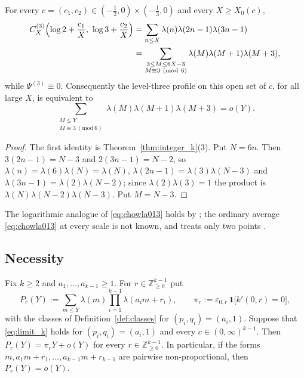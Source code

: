 \begin{corollary}
\label{cor:level3_23}
For every $c=(c_1,c_2)\in(-\tfrac12,0)\times(-\tfrac13,0)$ and every $X\ge X_0(c)$,
\begin{equation}
\begin{aligned}
C^{(3)}_X\Bigl(\log2+\frac{c_1}X,\ \log3+\frac{c_2}X\Bigr)&=\sum_{n\le X}\lambda(n)\lambda(2n-1)\lambda(3n-1)\\
&=\sum_{\substack{3\le M\le 6X-3\\ M\equiv3\ (\mathrm{mod}\ 6)}}\lambda(M)\lambda(M+1)\lambda(M+3),
\end{aligned}
\label{eq:level3_23}
\end{equation}
while $\Psi^{(3)}\equiv0$. Consequently the level-three profile on this open set of $c$, for all large $X$, is equivalent to
\begin{equation}
\sum_{\substack{M\le Y\\ M\equiv3\ (\mathrm{mod}\ 6)}}\lambda(M)\lambda(M+1)\lambda(M+3)=o(Y).
\label{eq:chowla013}
\end{equation}
\end{corollary}

\begin{proof}
The first identity is Theorem~\ref{thm:integer_k}(3). Put $N=6n$. Then $3(2n-1)=N-3$ and $2(3n-1)=N-2$, so $\lambda(n)=\lambda(6)\lambda(N)=\lambda(N)$, $\lambda(2n-1)=\lambda(3)\lambda(N-3)$ and $\lambda(3n-1)=\lambda(2)\lambda(N-2)$; since $\lambda(2)\lambda(3)=1$ the product is $\lambda(N)\lambda(N-2)\lambda(N-3)$. Put $M=N-3$.
\end{proof}

The logarithmic analogue of \eqref{eq:chowla013} holds by \cite[Theorem~1.1, p.~2]{TaoTeravainen2018}; the ordinary average \eqref{eq:chowla013} at every scale is not known, and \cite{OpenAI2026} treats only two points \cite[pp.~3--4]{OpenAI2026}.

\subsection{Necessity}
\label{subsec:kpoint_nec}

\begin{theorem}[Necessity]
\label{thm:nec_k}
Fix $k\ge2$ and $a_1,\dots,a_{k-1}\ge1$. For $r\in\mathbb Z_{\ge0}^{k-1}$ put
\begin{equation}
P_r(Y):=\sum_{m\le Y}\lambda(m)\prod_{i=1}^{k-1}\lambda(a_im+r_i),\qquad \pi_r:=\varepsilon_{0,r}\,\mathbf 1\bigl[k'(0,r)=0\bigr],
\label{eq:Pr}
\end{equation}
with the classes of Definition~\ref{def:classes} for $(p_i,q_i)=(a_i,1)$. Suppose that \eqref{eq:limit_k} holds for $(p_i,q_i)=(a_i,1)$ and every $c\in(0,\infty)^{k-1}$. Then $P_r(Y)=\pi_rY+o(Y)$ for every $r\in\mathbb Z_{\ge0}^{k-1}$. In particular, if the forms $m,a_1m+r_1,\dots,a_{k-1}m+r_{k-1}$ are pairwise non-proportional, then $P_r(Y)=o(Y)$.
\end{theorem}

